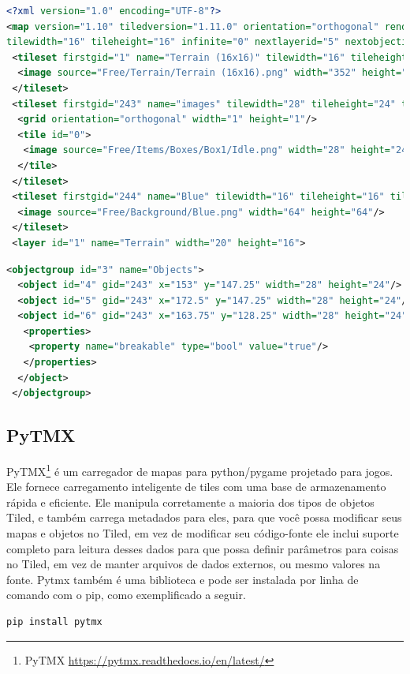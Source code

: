 \newpage
\begin{lstlisting}[language=xml,breaklines, caption= example.tmx terrain layer]
<?xml version="1.0" encoding="UTF-8"?>
<map version="1.10" tiledversion="1.11.0" orientation="orthogonal" renderorder="right-down" width="20" height="16" 
tilewidth="16" tileheight="16" infinite="0" nextlayerid="5" nextobjectid="7">
 <tileset firstgid="1" name="Terrain (16x16)" tilewidth="16" tileheight="16" tilecount="242" columns="22">
  <image source="Free/Terrain/Terrain (16x16).png" width="352" height="176"/>
 </tileset>
 <tileset firstgid="243" name="images" tilewidth="28" tileheight="24" tilecount="1" columns="0">
  <grid orientation="orthogonal" width="1" height="1"/>
  <tile id="0">
   <image source="Free/Items/Boxes/Box1/Idle.png" width="28" height="24"/>
  </tile>
 </tileset>
 <tileset firstgid="244" name="Blue" tilewidth="16" tileheight="16" tilecount="16" columns="4">
  <image source="Free/Background/Blue.png" width="64" height="64"/>
 </tileset>
 <layer id="1" name="Terrain" width="20" height="16">
\end{lstlisting}

\begin{lstlisting}[language=xml,breaklines, caption= example.tmx object layer]
 <objectgroup id="3" name="Objects">
  <object id="4" gid="243" x="153" y="147.25" width="28" height="24"/>
  <object id="5" gid="243" x="172.5" y="147.25" width="28" height="24"/>
  <object id="6" gid="243" x="163.75" y="128.25" width="28" height="24">
   <properties>
    <property name="breakable" type="bool" value="true"/>
   </properties>
  </object>
 </objectgroup>
\end{lstlisting}


\subsection{PyTMX}
PyTMX\footnote{PyTMX \url{https://pytmx.readthedocs.io/en/latest/}} é um carregador de mapas para python/pygame projetado para jogos. Ele fornece carregamento inteligente de tiles com uma base de armazenamento rápida e eficiente. Ele manipula corretamente a maioria dos tipos de objetos Tiled, e também carrega metadados para eles, para que você possa modificar seus mapas e objetos no Tiled, em vez de modificar seu código-fonte ele inclui suporte completo para leitura desses dados para que possa definir parâmetros para coisas no Tiled, em vez de manter arquivos de dados externos, ou mesmo valores na fonte. Pytmx também é uma biblioteca e pode ser instalada por linha de comando com o pip, como exemplificado a seguir.
\begin{lstlisting}[language=bash,breaklines, caption= Instalação Pytmx]
pip install pytmx
\end{lstlisting}

